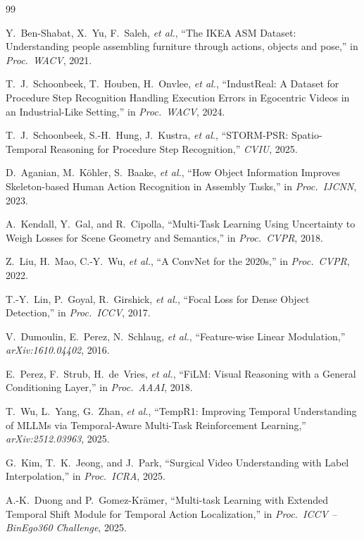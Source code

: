 \documentclass[10pt,twocolumn]{article}
\begin{document}
\begin{thebibliography}{99}

Y.~Ben-Shabat, X.~Yu, F.~Saleh, \emph{et al.},
``The IKEA ASM Dataset: Understanding people assembling furniture through actions, objects and pose,''
in \emph{Proc.\ WACV}, 2021.

T.~J.~Schoonbeek, T.~Houben, H.~Onvlee, \emph{et al.},
``IndustReal: A Dataset for Procedure Step Recognition Handling Execution Errors in Egocentric Videos in an Industrial-Like Setting,''
in \emph{Proc.\ WACV}, 2024.

T.~J.~Schoonbeek, S.-H.~Hung, J.~Kustra, \emph{et al.},
``STORM-PSR: Spatio-Temporal Reasoning for Procedure Step Recognition,''
\emph{CVIU}, 2025.

D.~Aganian, M.~K\"ohler, S.~Baake, \emph{et al.},
``How Object Information Improves Skeleton-based Human Action Recognition in Assembly Tasks,''
in \emph{Proc.\ IJCNN}, 2023.

A.~Kendall, Y.~Gal, and R.~Cipolla,
``Multi-Task Learning Using Uncertainty to Weigh Losses for Scene Geometry and Semantics,''
in \emph{Proc.\ CVPR}, 2018.

Z.~Liu, H.~Mao, C.-Y.~Wu, \emph{et al.},
``A ConvNet for the 2020s,''
in \emph{Proc.\ CVPR}, 2022.

T.-Y.~Lin, P.~Goyal, R.~Girshick, \emph{et al.},
``Focal Loss for Dense Object Detection,''
in \emph{Proc.\ ICCV}, 2017.

V.~Dumoulin, E.~Perez, N.~Schlaug, \emph{et al.},
``Feature-wise Linear Modulation,''
\emph{arXiv:1610.04402}, 2016.

E.~Perez, F.~Strub, H.~de~Vries, \emph{et al.},
``FiLM: Visual Reasoning with a General Conditioning Layer,''
in \emph{Proc.\ AAAI}, 2018.

T.~Wu, L.~Yang, G.~Zhan, \emph{et al.},
``TempR1: Improving Temporal Understanding of MLLMs via Temporal-Aware Multi-Task Reinforcement Learning,''
\emph{arXiv:2512.03963}, 2025.

G.~Kim, T.~K.~Jeong, and J.~Park,
``Surgical Video Understanding with Label Interpolation,''
in \emph{Proc.\ ICRA}, 2025.

A.-K.~Duong and P.~Gomez-Kr\"amer,
``Multi-task Learning with Extended Temporal Shift Module for Temporal Action Localization,''
in \emph{Proc.\ ICCV -- BinEgo360 Challenge}, 2025.


\end{thebibliography}
\end{document}
